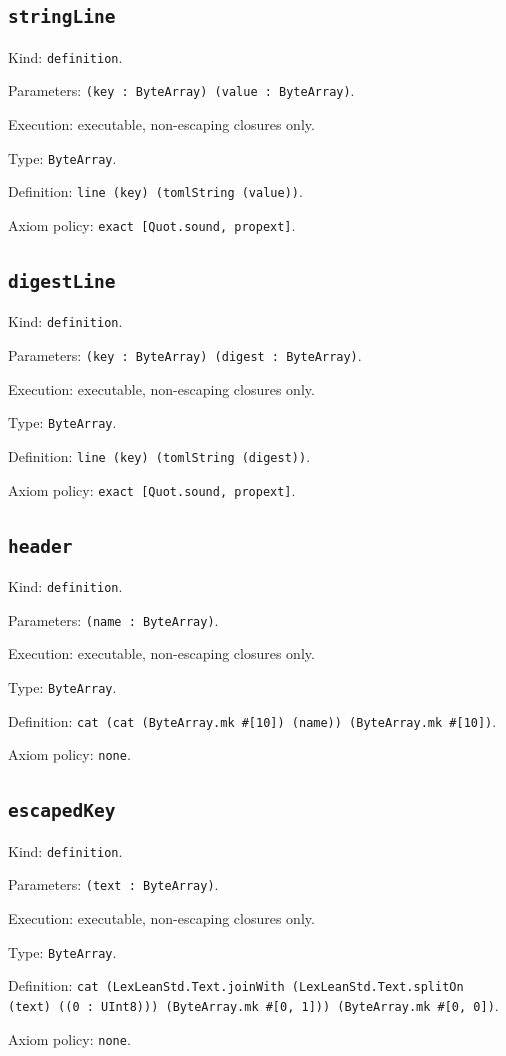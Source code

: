 \documentclass[11pt]{article}
\begin{document}
\subsection*{\texttt{stringLine}}
\noindent Kind: \texttt{definition}.\par
\noindent Parameters: \texttt{(key : ByteArray) (value : ByteArray)}.\par
\noindent Execution: executable, non-escaping closures only.\par
\noindent Type: \texttt{ByteArray}.\par
\noindent Definition: \texttt{line (key) (tomlString (value))}.\par
\noindent Axiom policy: \texttt{exact [Quot.sound, propext]}.\par
\subsection*{\texttt{digestLine}}
\noindent Kind: \texttt{definition}.\par
\noindent Parameters: \texttt{(key : ByteArray) (digest : ByteArray)}.\par
\noindent Execution: executable, non-escaping closures only.\par
\noindent Type: \texttt{ByteArray}.\par
\noindent Definition: \texttt{line (key) (tomlString (digest))}.\par
\noindent Axiom policy: \texttt{exact [Quot.sound, propext]}.\par
\subsection*{\texttt{header}}
\noindent Kind: \texttt{definition}.\par
\noindent Parameters: \texttt{(name : ByteArray)}.\par
\noindent Execution: executable, non-escaping closures only.\par
\noindent Type: \texttt{ByteArray}.\par
\noindent Definition: \texttt{cat (cat (ByteArray.mk \#[10]) (name)) (ByteArray.mk \#[10])}.\par
\noindent Axiom policy: \texttt{none}.\par
\subsection*{\texttt{escapedKey}}
\noindent Kind: \texttt{definition}.\par
\noindent Parameters: \texttt{(text : ByteArray)}.\par
\noindent Execution: executable, non-escaping closures only.\par
\noindent Type: \texttt{ByteArray}.\par
\noindent Definition: \texttt{cat (LexLeanStd.Text.joinWith (LexLeanStd.Text.splitOn (text) ((0 : UInt8))) (ByteArray.mk \#[0, 1])) (ByteArray.mk \#[0, 0])}.\par
\noindent Axiom policy: \texttt{none}.\par
\end{document}

